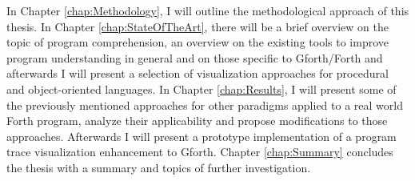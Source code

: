 In Chapter \ref{chap:Methodology}, I will outline the methodological approach of this thesis. In Chapter \ref{chap:StateOfTheArt}, there will be a brief overview on the topic of program comprehension, an overview on the existing tools to improve program understanding in general and on those specific to Gforth/Forth and afterwards I will present a selection of visualization approaches for procedural and object-oriented languages. In Chapter \ref{chap:Results}, I will present some of the previously mentioned approaches for other paradigms applied to a real world Forth program, analyze their applicability and propose modifications to those approaches. Afterwards I will present a prototype implementation of a program trace visualization enhancement to Gforth. Chapter \ref{chap:Summary} concludes the thesis with a summary and topics of further investigation.

\begin{comment}
At first, the available information of a forth program is identified. The next step is to characterize the information and its necessity for program comprehension is investigated. The differences of forth and object oriented languages are summarized and then the applicability of existing analysis and visualization methods is presented. \hl{Since there is no standard implementation of object orientation if forth, this thesis won't take any object orientation implementation into account.}
The last part of this thesis investigates probable enhancements and modifications to existing methods and proposes new approaches.
After the conclusion, the thesis presents further suggestions to support program comprehension and further topics of research in this direction.
\end{comment}